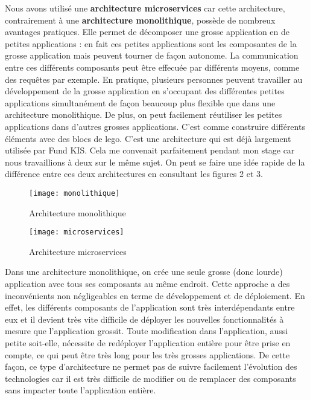 \vspace{3mm}

Nous avons utilisé une \textbf{architecture microservices} car cette architecture, contrairement à une \textbf{architecture monolithique}, possède de nombreux avantages pratiques. Elle permet de décomposer une grosse application en de petites applications : en fait ces petites applications sont les composantes de la grosse application mais peuvent tourner de façon autonome. La communication entre ces différents composants peut être effecuée par différents moyens, comme des requêtes par exemple. En pratique, plusieurs personnes peuvent travailler au développement de la grosse application en s'occupant des différentes petites applications simultanément de façon beaucoup plus flexible que dans une architecture monolithique. De plus, on peut facilement réutiliser les petites applications dans d'autres grosses applications. C'est comme construire différents éléments avec des blocs de lego. C'est une architecture qui est déjà largement utilisée par Fund KIS. Cela me convenait parfaitement pendant mon stage car nous travaillions à deux sur le même sujet. On peut se faire une idée rapide de la différence entre ces deux architectures en consultant les figures 2 et 3.

\begin{figure}[!h]
\centering
\texttt{[image: monolithique]}
\caption{Architecture monolithique}
\end{figure}

\begin{figure}[!h]
\centering
\texttt{[image: microservices]}
\caption{Architecture microservices}
\end{figure}

\vspace{3mm}

Dans une architecture monolithique, on crée une seule grosse (donc lourde) application avec tous ses composants au même endroit. Cette approche a des inconvénients non négligeables en terme de développement et de déploiement. En effet, les différents composants de l'application sont très interdépendants entre eux et il devient très vite difficile de déployer les nouvelles fonctionnalités à mesure que l'application grossit. Toute modification dans l'application, aussi petite soit-elle, nécessite de redéployer l'application entière pour être prise en compte, ce qui peut être très long pour les très grosses applications. De cette façon, ce type d'architecture ne permet pas de suivre facilement l'évolution des technologies car il est très difficile de modifier ou de remplacer des composants sans impacter toute l'application entière.

